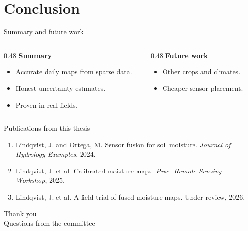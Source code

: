 \documentclass{beamer}
\begin{document}
\section{Conclusion}
\begin{frame}{Summary and future work}
  \begin{columns}[T]
    \begin{column}{0.48\textwidth}
      \textbf{Summary}
      \begin{itemize}
        \item Accurate daily maps from sparse data.
        \item Honest uncertainty estimates.
        \item Proven in real fields.
      \end{itemize}
    \end{column}
    \begin{column}{0.48\textwidth}
      \textbf{Future work}
      \begin{itemize}
        \item Other crops and climates.
        \item Cheaper sensor placement.
      \end{itemize}
    \end{column}
  \end{columns}
\end{frame}

\begin{frame}{Publications from this thesis}
  \small
  \begin{enumerate}
    \item Lindqvist, J. and Ortega, M. Sensor fusion for soil moisture. \emph{Journal of Hydrology Examples}, 2024.
    \item Lindqvist, J. et al. Calibrated moisture maps. \emph{Proc. Remote Sensing Workshop}, 2025.
    \item Lindqvist, J. et al. A field trial of fused moisture maps. Under review, 2026.
  \end{enumerate}
\end{frame}

\begin{frame}
  \centering\Huge Thank you\\[1em]
  \large Questions from the committee
\end{frame}
\end{document}
